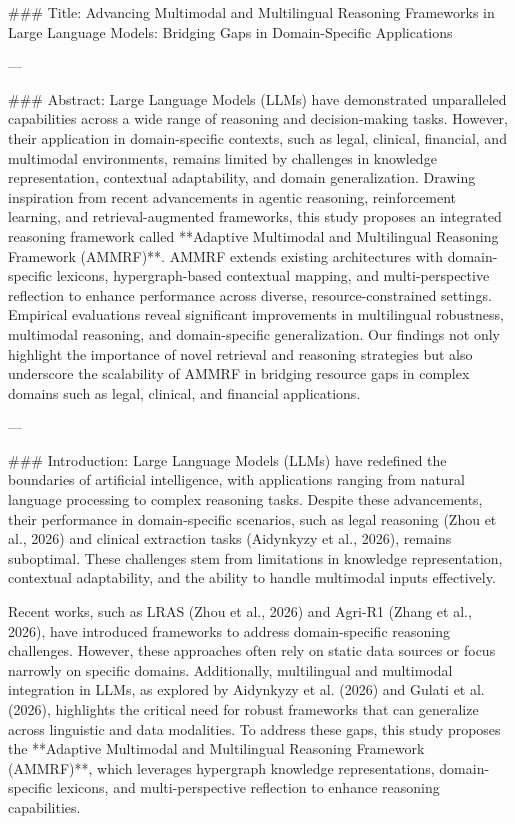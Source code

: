 ### Title:
Advancing Multimodal and Multilingual Reasoning Frameworks in Large Language Models: Bridging Gaps in Domain-Specific Applications

---

### Abstract:
Large Language Models (LLMs) have demonstrated unparalleled capabilities across a wide range of reasoning and decision-making tasks. However, their application in domain-specific contexts, such as legal, clinical, financial, and multimodal environments, remains limited by challenges in knowledge representation, contextual adaptability, and domain generalization. Drawing inspiration from recent advancements in agentic reasoning, reinforcement learning, and retrieval-augmented frameworks, this study proposes an integrated reasoning framework called **Adaptive Multimodal and Multilingual Reasoning Framework (AMMRF)**. AMMRF extends existing architectures with domain-specific lexicons, hypergraph-based contextual mapping, and multi-perspective reflection to enhance performance across diverse, resource-constrained settings. Empirical evaluations reveal significant improvements in multilingual robustness, multimodal reasoning, and domain-specific generalization. Our findings not only highlight the importance of novel retrieval and reasoning strategies but also underscore the scalability of AMMRF in bridging resource gaps in complex domains such as legal, clinical, and financial applications.

---

### Introduction:
Large Language Models (LLMs) have redefined the boundaries of artificial intelligence, with applications ranging from natural language processing to complex reasoning tasks. Despite these advancements, their performance in domain-specific scenarios, such as legal reasoning (Zhou et al., 2026) and clinical extraction tasks (Aidynkyzy et al., 2026), remains suboptimal. These challenges stem from limitations in knowledge representation, contextual adaptability, and the ability to handle multimodal inputs effectively.

Recent works, such as LRAS (Zhou et al., 2026) and Agri-R1 (Zhang et al., 2026), have introduced frameworks to address domain-specific reasoning challenges. However, these approaches often rely on static data sources or focus narrowly on specific domains. Additionally, multilingual and multimodal integration in LLMs, as explored by Aidynkyzy et al. (2026) and Gulati et al. (2026), highlights the critical need for robust frameworks that can generalize across linguistic and data modalities. To address these gaps, this study proposes the **Adaptive Multimodal and Multilingual Reasoning Framework (AMMRF)**, which leverages hypergraph knowledge representations, domain-specific lexicons, and multi-perspective reflection to enhance reasoning capabilities.

